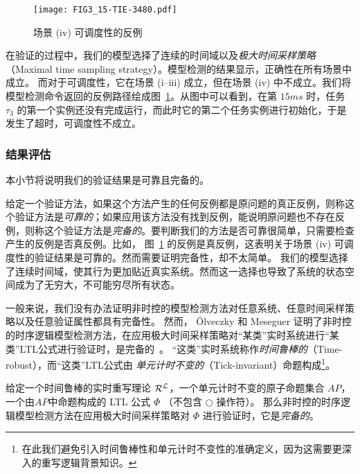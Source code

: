 \begin{landscape}
\begin{figure}
\centering
\texttt{[image: FIG3\_15-TIE-3480.pdf]}
\caption{场景 (iv) 可调度性的反例}
\label{f:counterexample}
\end{figure}
\end{landscape}

在验证的过程中，我们的模型选择了连续的时间域以及\emph{极大时间采样策略}（Maximal time sampling strategy）。模型检测的结果显示，正确性在所有场景中成立。
而对于可调度性，它在场景 (i--iii) 成立，但在场景 (iv) 中不成立。我们将模型检测命令返回的反例路径绘成图~\ref{f:counterexample}。从图中可以看到，在第 $15ms$ 时，任务 $\tau_3$ 的第一个实例还没有完成运行，而此时它的第二个任务实例进行初始化，于是发生了超时，可调度性不成立。


\subsubsection{结果评估}
本小节将说明我们的验证结果是可靠且完备的。

给定一个验证方法，如果这个方法产生的任何反例都是原问题的真正反例，则称这个验证方法是\emph{可靠的}；如果应用该方法没有找到反例，能说明原问题也不存在反例，则称这个验证方法是\emph{完备的}。要判断我们的方法是否可靠很简单，只需要检查产生的反例是否真反例。比如，
图~\ref{f:counterexample} 的反例是真反例，这表明关于场景 (iv) 可调度性的验证结果是可靠的。然而需要证明完备性，却不太简单。
我们的模型选择了连续时间域，使其行为更加贴近真实系统。然而这一选择也导致了系统的状态空间成为了无穷大，不可能穷尽所有状态。

一般来说，我们没有办法证明非时控的模型检测方法对任意系统、任意时间采样策略以及任意验证属性都具有完备性。
然而， \"Olveczky 和 Meseguer 证明了非时控的时序逻辑模型检测方法，在应用极大时间采样策略对“某类”实时系统进行“某类”LTL公式进行验证时，是完备的~\cite{DBLP:journals/entcs/OlveczkyM07a}。
“这类”实时系统称作\emph{时间鲁棒的}（Time-robust），而“这类”LTL公式由
\emph{单元计时不变的}（Tick-invariant）命题构成\footnote{在此我们避免引入时间鲁棒性和单元计时不变性的准确定义，因为这需要更深入的重写逻辑背景知识。}。
\begin{theorem}
\label{t:completeness}
给定一个时间鲁棒的实时重写理论 $\mathcal{R}^{\mathcal{L}}$，一个单元计时不变的原子命题集合 $AP$，一个由$AP$中命题构成的 LTL 公式 $\Phi$ （不包含 $\bigcirc$ 操作符）。
那么非时控的时序逻辑模型检测方法在应用极大时间采样策略对 $\Phi$ 进行验证时，它是\emph{完备的}。
\end{theorem}

